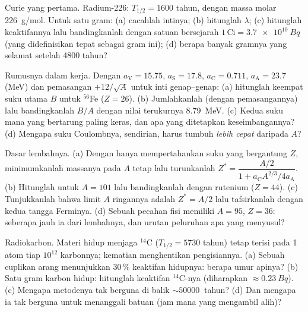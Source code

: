 \begin{exercise}[$\star$]\label{exo:b3:nuclear-physics:4}
Curie yang pertama. Radium-226: $T_{1/2} = 1600$ tahun, dengan massa molar
\qty{226}{g/mol}. Untuk satu gram: (a) cacahlah intinya; (b) hitunglah
$\lambda$; (c) hitunglah keaktifannya lalu bandingkanlah dengan satuan
bersejarah $1\,\text{Ci} = \qty{3.7e10}{Bq}$ (yang didefinisikan tepat sebagai
gram ini); (d) berapa banyak gramnya yang selamat setelah 4800 tahun?
\end{exercise}

\begin{exercise}[$\star\star$]\label{exo:b3:nuclear-physics:5}
Rumusnya dalam kerja. Dengan $a_{\text{V}} = 15.75$,
$a_{\text{S}} = 17.8$, $a_{\text{C}} = 0.711$,
$a_{\text{A}} = 23.7$ (\unit{MeV}) dan pemasangan
$+12/\sqrt A$ untuk inti genap--genap: (a) hitunglah keempat suku
utama $B$ untuk $^{56}$Fe ($Z = 26$). (b) Jumlahkanlah (dengan pemasangannya) lalu
bandingkanlah $B/A$ dengan nilai terukurnya \qty{8.79}{MeV}. (c) Kedua
suku mana yang bertarung paling keras, dan apa yang ditetapkan keseimbangannya? (d) Mengapa
suku Coulombnya, sendirian, harus tumbuh \emph{lebih cepat} daripada $A$?
\end{exercise}

\begin{exercise}[$\star\star$]\label{exo:b3:nuclear-physics:6}
Dasar lembahnya. (a) Dengan hanya mempertahankan suku yang bergantung $Z$,
minimumkanlah massanya pada $A$ tetap lalu turunkanlah
$Z^* = \dfrac{A/2}{1 + a_{\text{C}}A^{2/3}/4a_{\text{A}}}$. (b)
Hitunglah untuk $A = 101$ lalu bandingkanlah dengan rutenium ($Z = 44$).
(c) Tunjukkanlah bahwa limit $A$ ringannya adalah $Z^* = A/2$ lalu tafsirkanlah dengan
kedua tangga Ferminya. (d) Sebuah pecahan fisi memiliki $A = 95$,
$Z = 36$: seberapa jauh ia dari lembahnya, dan urutan peluruhan apa yang menyusul?
\end{exercise}

\begin{exercise}[$\star\star$]\label{exo:b3:nuclear-physics:7}
Radiokarbon. Materi hidup menjaga $^{14}$C
($T_{1/2} = 5730$ tahun) tetap terisi pada 1 atom tiap $10^{12}$
karbonnya; kematian menghentikan pengisiannya. (a) Sebuah cuplikan arang menunjukkan
30\,\% keaktifan hidupnya: berapa umur apinya? (b) Satu gram
karbon hidup: hitunglah keaktifan $^{14}$C-nya
(diharapkan $\approx\qty{0.23}{Bq}$). (c) Mengapa metodenya tak berguna
di balik $\sim\qty{50000}{}$ tahun? (d) Dan mengapa ia tak berguna untuk
menanggali batuan (jam mana yang mengambil alih)?
\end{exercise}

